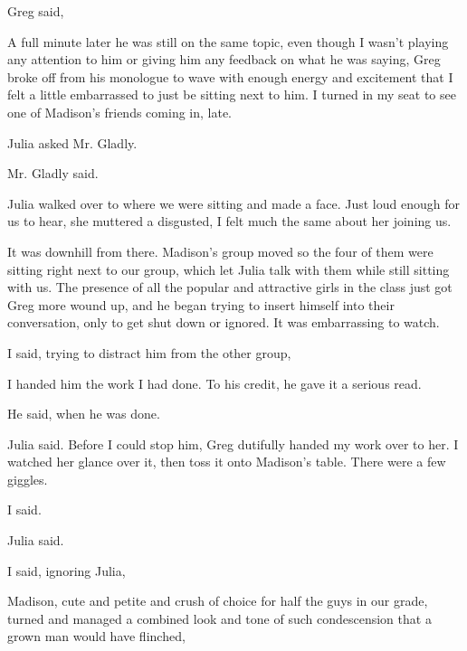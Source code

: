 Greg said, 

A full minute later he was still on the same topic, even though I wasn't playing any attention to him or giving him any feedback on what he was saying,  Greg broke off from his monologue to wave with enough energy and excitement that I felt a little embarrassed to just be sitting next to him. I turned in my seat to see one of Madison's friends coming in, late.

 Julia asked Mr. Gladly.

 Mr. Gladly said.

Julia walked over to where we were sitting and made a face. Just loud enough for us to hear, she muttered a disgusted,  I felt much the same about her joining us.

It was downhill from there. Madison's group moved so the four of them were sitting right next to our group, which let Julia talk with them while still sitting with us. The presence of all the popular and attractive girls in the class just got Greg more wound up, and he began trying to insert himself into their conversation, only to get shut down or ignored. It was embarrassing to watch.

 I said, trying to distract him from the other group, 

I handed him the work I had done. To his credit, he gave it a serious read.

 He said, when he was done.

 Julia said. Before I could stop him, Greg dutifully handed my work over to her. I watched her glance over it, then toss it onto Madison's table. There were a few giggles.

 I said.

 Julia said.

 I said, ignoring Julia, 

Madison, cute and petite and crush of choice for half the guys in our grade, turned and managed a combined look and tone of such condescension that a grown man would have flinched, 

